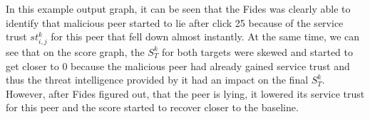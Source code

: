 In this example output graph, it can be seen that the Fides was clearly able to identify that malicious peer started to lie after click 25 because of the service trust $st^{k}_{i,j}$ for this peer that fell down almost instantly.
At the same time, we can see that on the score graph, the $S^{k}_{T}$ for both targets were skewed and started to get closer to $0$ because the malicious peer had already gained service trust and thus the threat intelligence provided by it had an impact on the final $S^{k}_{T}$.
However, after Fides figured out, that the peer is lying, it lowered its service trust for this peer and the score started to recover closer to the baseline.